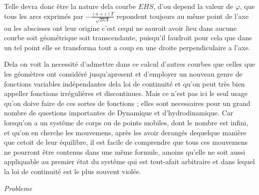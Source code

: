 \documentclass[11pt,a4paper]{article}
\begin{document}
Telle devra donc être la nature dela courbe $EHS$, d'ou
depend la valeur de $\varphi$, que tous les arcs exprimés par $-\frac{(a+z)T}{\sqrt{2hA}}$
repondent toujours au même point de l'axe ou les abscisses ont
leur origine c'est cequi ne \struck{\ill{}} sauroit avoir lieu dans aucune courbe
soit géométrique soit transcendante, puisqu'il faudroit pour cela que dans
un tel point elle se transforma tout a coup en une droite perpendiculaire
a l'axe.



Dela on voit la necessité d'admettre dans ce calcul d'autres courbes que
celles que les géomètres ont considéré jusqu'apresent et d'employer un
nouveau genre de fonctions variables indépendantes dela loi de continuité
et qu'on peut très bien appeller fonctions irrégulières et discontinues.
Mais ce n'est pas ici le seul usage qu'on doive faire de ces sortes
de fonctions ; elles sont necessaires pour un grand nombre de questions
importantes de Dynamique et d'hydrodinamique. Car lorsqu'on
a un systême de corps ou de points mobiles, dont le nombre est
infini, et qu'on en cherche les mouvemens, après les avoir derangés
dequelque manière que cetoit de leur équilibre, il est facile de
comprendre que tous ces mouvemens ne pourront être contenus dans
une même formule, amoins qu'elle ne soit aussi appliquable
au premier état du systême qui est tout-afait arbitraire et
dans  lequel la loi de continuité est le plus souvent violée.

\emph{Probleme}
\end{document}
